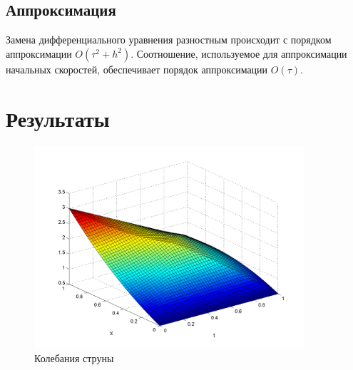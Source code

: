 \documentclass[a4paper,12pt]{article}
\begin{document}
\subsection{Аппроксимация}
Замена дифференциального уравнения разностным происходит с порядком аппроксимации $O(\tau^2 + h^2)$. 
Соотношение, используемое для аппроксимации начальных скоростей, обеспечивает порядок аппроксимации $O(\tau)$. 

\section{Результаты}

\begin{figure}[h]
\centering
\includegraphics[width = 10cm]{screen.png}
\caption{Колебания струны}
\label{fig:1}	
\end{figure}
\end{document}
